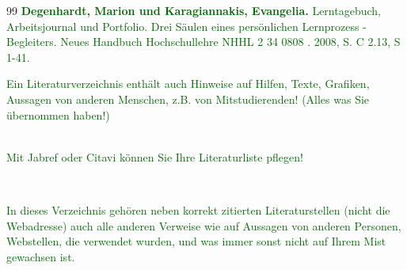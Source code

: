 \documentclass[pdftex,12pt,twoside,footsepline,headsepline,a4paper,final]{scrreprt}
\begin{document}

\def\bibname{Referenzen und Literaturverzeichnis}




\begin{thebibliography}{99}
\textcolor{darkgreen}{\textbf{Degenhardt, Marion und Karagiannakis, Evangelia.} Lerntagebuch, Arbeitsjournal und Portfolio. Drei S\"{a}ulen eines pers\"{o}nlichen Lernprozess - Begleiters. Neues Handbuch Hochschullehre NHHL 2 34 0808 . 2008, S. C 2.13, S 1-41.}
\end{thebibliography}


%


\textcolor{darkgreen}{Ein Literaturverzeichnis enth\"{a}lt auch Hinweise auf Hilfen, Texte, Grafiken, Aussagen von anderen Menschen, z.B. von Mitstudierenden! (Alles was Sie \"{u}bernommen haben!)
}

$_{}$
\\

\textcolor{darkgreen}{Mit Jabref oder Citavi k\"{o}nnen Sie Ihre Literaturliste pflegen!}


$_{}$
\\ \indent

\textcolor{darkgreen}{In dieses Verzeichnis geh\"{o}ren neben korrekt zitierten Literaturstellen (nicht die Webadresse) auch alle anderen Verweise wie auf Aussagen von anderen Personen, Webstellen, die verwendet wurden, und was immer sonst nicht auf Ihrem Mist gewachsen ist.}
\end{document}
